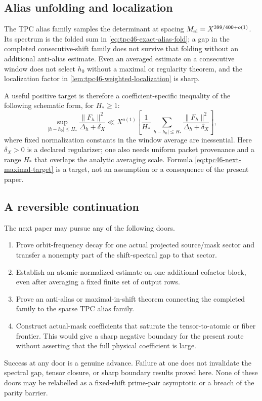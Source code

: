 \subsection{Alias unfolding and localization}

The TPC alias family samples the determinant at spacing
\(M_{\rm al}=X^{399/400+o(1)}\).  Its spectrum is the folded sum in
\cref{eq:tpc46-exact-alias-fold}; a gap in the completed consecutive-shift
family does not survive that folding without an additional anti-alias
estimate.  Even an averaged estimate on a consecutive window does not
select \(h_0\) without a maximal or regularity theorem, and the
localization factor in \cref{lem:tpc46-weighted-localization} is sharp.

A useful positive target is therefore a coefficient-specific
inequality of the following schematic form, for \(H_*\ge1\):
\begin{equation}
 \sup_{|h-h_0|\le H_*}
 \frac{\|F_h\|^2}{\Delta_h+\delta_X}
 \ll X^{o(1)}
 \left[
  \frac1{H_*}\sum_{|h-h_0|\le H_*}
  \frac{\|F_h\|^2}{\Delta_h+\delta_X}
 \right],
 \label{eq:tpc46-next-maximal-target}
\end{equation}
where fixed normalization constants in the window average are
inessential.  Here \(\delta_X>0\) is a declared regularizer; one also
needs uniform packet provenance
and a range \(H_*\) that overlaps the analytic averaging scale.  Formula
\eqref{eq:tpc46-next-maximal-target} is a target, not an assumption or a
consequence of the present paper.

\subsection{A reversible continuation}

The next paper may pursue any of the following doors.
\begin{enumerate}[label=\textbf{Door \Alph*.},leftmargin=3.7em]
 \item Prove orbit-frequency decay for one actual projected
       source/mask sector and transfer a nonempty part of the
       shift-spectral gap to that sector.
 \item Establish an atomic-normalized estimate on one additional
       cofactor block, even after averaging a fixed finite set of
       output rows.
 \item Prove an anti-alias or maximal-in-shift theorem connecting the
       completed family to the sparse TPC alias family.
 \item Construct actual-mask coefficients that saturate the
       tensor-to-atomic or fiber frontier.  This would give a sharp
       negative boundary for the present route without asserting that
       the full physical coefficient is large.
\end{enumerate}
Success at any door is a genuine advance.  Failure at one does not
invalidate the spectral gap, tensor closure, or sharp boundary results
proved here.  None of these doors may be relabelled as a fixed-shift
prime-pair asymptotic or a breach of the parity barrier.
